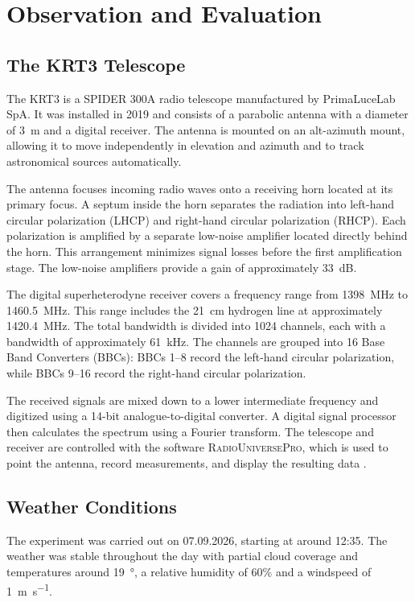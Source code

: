 \documentclass[10pt,a4paper, bibliography=totoc]{scrartcl}
\begin{document}
\section{Observation and Evaluation}
\subsection{The KRT3 Telescope}
The KRT3 is a SPIDER 300A radio telescope manufactured by PrimaLuceLab SpA. It was installed in 2019 and consists of a parabolic antenna with a diameter of \qty{3}{m} and a digital receiver. The antenna is mounted on an alt-azimuth mount, allowing it to move independently in elevation and azimuth and to track astronomical sources automatically.

The antenna focuses incoming radio waves onto a receiving horn located at its primary focus. A septum inside the horn separates the radiation into left-hand circular polarization (LHCP) and right-hand circular polarization (RHCP). Each polarization is amplified by a separate low-noise amplifier located directly behind the horn. This arrangement minimizes signal losses before the first amplification stage. The low-noise amplifiers provide a gain of approximately \qty{33}{dB}.

The digital superheterodyne receiver covers a frequency range from \qty{1398}{MHz} to \qty{1460.5}{MHz}. This range includes the \qty{21}{cm} hydrogen line at approximately \qty{1420.4}{MHz}. The total bandwidth is divided into 1024 channels, each with a bandwidth of approximately \qty{61}{kHz}. The channels are grouped into 16 Base Band Converters (BBCs): BBCs 1--8 record the left-hand circular polarization, while BBCs 9--16 record the right-hand circular polarization.

The received signals are mixed down to a lower intermediate frequency and digitized using a 14-bit analogue-to-digital converter. A digital signal processor then calculates the spectrum using a Fourier transform. The telescope and receiver are controlled with the software \textsc{RadioUniversePro}, which is used to point the antenna, record measurements, and display the resulting data \cite{0}.

\subsection{Weather Conditions}
The experiment was carried out on 07.09.2026, starting at around 12:35. The weather was stable throughout the day with partial cloud coverage and temperatures around \qty{19}{\degree}, a relative humidity of 60\% and a windspeed of \qty{1}{\m\per\s}.
\end{document}
